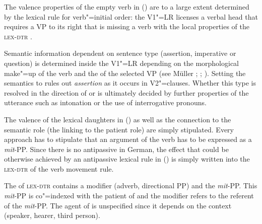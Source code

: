 \begin{exe}
\begin{xlist}[iv.]
\begin{exe}
\begin{xlist}[iv.]
{{{{{{{                                                  }\\
                                                 }\\
                                      }\\
                          }\\
}\\
}}
\z
%
The valence properties of the empty verb in () are to a large extent determined by the lexical rule for verb"=initial order: the V1"=LR licenses a verbal head
that requires a VP to its right that is missing a verb with the local properties of the \textsc{lex-dtr} .

Semantic information dependent on sentence type (assertion, imperative or question) is determined inside the V1"=LR depending on the morphological
make"=up of the verb and the \slashv of the selected VP (see Müller
\citeyear[Section~10.3]{MuellerLehrbuch1}; \citeyear{MuellerSatztypen}; \citeyear{MuellerGS}).
Setting the semantics to   rules out \emph{assertion} as it occurs in V2"=clauses.
Whether this type is resolved in the direction of  or
 is ultimately decided by further properties of the utterance such as intonation or the use of interrogative pronouns.

\addlines[2]
The valence of the lexical daughters in () as well as the connection to the semantic role (the linking to the patient role) are simply stipulated.
Every approach has to stipulate that an argument of the verb has to be expressed as a \emph{mit}-PP. Since there is no antipassive in German,
the effect that could be otherwise achieved by an antipassive lexical rule in () is simply written into the \textsc{lex-dtr} of the verb movement rule.

The \compsl of \textsc{lex-dtr} contains a modifier (adverb, directional PP) and the 
\emph{mit}-PP. This \emph{mit}-PP is co"=indexed with the patient of  and the modifier refers to the referent of the \emph{mit}-PP. The agent
of  is unspecified since it depends on the context (speaker, hearer, third person).


\end{xlist}
\end{exe}
\end{xlist}
\end{exe}
